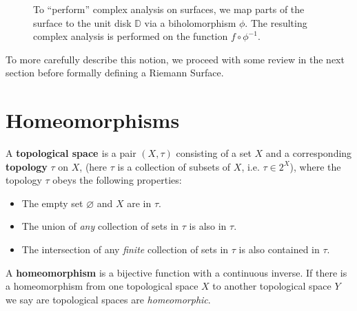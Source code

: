 \begin{figure}[H]\begin{center}
\end{center}\caption{To ``perform'' complex analysis on surfaces, we map parts of the surface to the unit disk $\mathbb{D}$ via a biholomorphism $\phi$. The resulting complex analysis is performed on the function $f\circ \phi^{-1}$.}\end{figure} To more carefully describe this notion, we proceed with some review in the next section before formally defining a Riemann Surface.

\section{Homeomorphisms}
\begin{definition}A \textbf{\textcolor{myblue}{topological space }} is a pair $(X,\tau)$ consisting of a set $X$ and a corresponding \textbf{\textcolor{myblue}{topology}} $\tau$ on $X$, (here $\tau$ is a collection of subsets of $X$, i.e. $\tau\in 2^X$), where the topology $\tau$ obeys the following properties: \begin{itemize}\setlength{\itemsep}{.1ex}\item The empty set $\varnothing$ and $X$ are in $\tau$. \item The union of \textit{any} collection of sets in $\tau$ is also in $\tau$. \item The intersection of any \textit{finite} collection of sets in $\tau$ is also contained in $\tau$.  \end{itemize}  \end{definition}


\begin{definition} A \textbf{\textcolor{myblue}{homeomorphism}} is a bijective function with a continuous inverse. If there is a homeomorphism from one topological space $X$ to another topological space $Y$ we say are topological spaces are \textit{homeomorphic}.
\end{definition}

